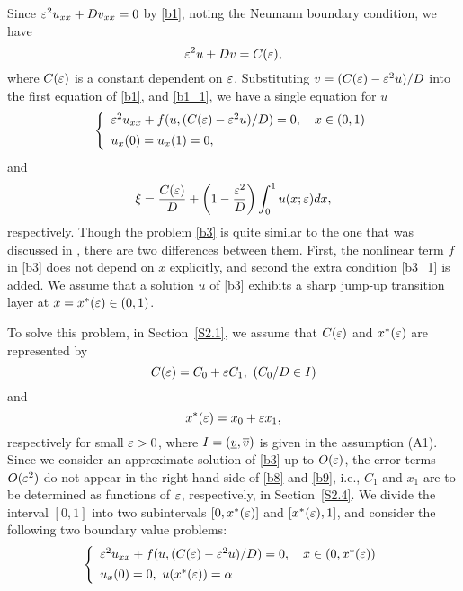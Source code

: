 \documentclass[a4,10pt]{article}
\begin{document}
Since $\varepsilon^2 u_{xx} + Dv_{xx} = 0$ by \eqref{b1}, noting the Neumann
boundary condition, we have
%
\[%
\ep^2 u + Dv = C(\ep),
\]%
%
where $C(\varepsilon)$ is a constant dependent on $\varepsilon$. 
Substituting $v = ( C(\varepsilon) - \varepsilon^2 u )/D$ into the first equation of \eqref{b1}, 
and \eqref{b1_1}, we have a single equation for $u$ 
%
\begin{equation}\label{b3}
\left \{
\begin{array}{l}
\varepsilon^2 u_{xx} + f(u,  (C(\varepsilon) - \varepsilon^2 u )/D ) = 0, \ \ \ x \in (0, 1)  \\[1ex]
u_x(0) = u_x(1) = 0, 
\end{array} 
\right.
\end{equation}
%
and 
\begin{equation}\label{b3_1}
\xi = \displaystyle\frac{C(\varepsilon)}{D} + \left( 1 - \frac{\varepsilon^2}{D} \right) \int_0^1 u(x ; \varepsilon)dx,
\end{equation}
respectively. Though the problem \eqref{b3} is quite similar to the one that was discussed in \cite{I}, there are two differences between them. First, the nonlinear term $f$ in \eqref{b3} does not depend on $x$ explicitly, and second the extra condition  \eqref{b3_1} is added. We assume that a solution $u$ of \eqref{b3} exhibits a sharp jump-up transition layer at $x= x^*(\varepsilon) \in (0,1)$.\par 
To solve this problem, in Section~\ref{S2.1}, we assume that $C(\varepsilon)$ and $ x^*(\varepsilon)$ 
are represented by 
\begin{equation}\label{b8}
C(\varepsilon) = C_0 + \varepsilon C_1, \ (C_0/D \in I) 
\end{equation}
%
and
%
\begin{equation}\label{b9}
x^*(\varepsilon) = x_0 +  \varepsilon x_1,
\end{equation}
respectively
for small $\varepsilon > 0$, where 
$I = (\underline{v}, \overline{v})$ is given in the assumption (A1).
Since we consider an approximate solution of \eqref{b3} 
up to $O(\varepsilon)$, the error terms $O(\varepsilon^2)$ do not appear in the
right hand side of \eqref{b8} and \eqref{b9}, i.e., 
$C_1$ and $x_1$ are to be determined as functions of $\varepsilon$, respectively, in Section~\ref{S2.4}.
We divide the interval $[0, 1]$ into two subintervals $[0, x^*(\varepsilon)]$ and $[x^*(\varepsilon), 1]$, and consider the following two boundary value problems: 
%
\begin{equation}\label{b5}
\left \{
\begin{array}{l}
\varepsilon^2 u_{xx} + f( u,  (C(\varepsilon) - \varepsilon^2 u )/D ) = 0, \ \ \ x \in  (0, x^*(\varepsilon))   \\[1ex]
u_x(0) = 0, \ u(x^*(\varepsilon)) = \alpha
\end{array} 
\right.
\end{equation}
\end{document}
